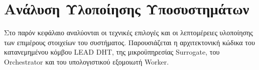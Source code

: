 
\chapter{Ανάλυση Υλοποίησης Υποσυστημάτων}
\label{ch:implementation}

Στο παρόν κεφάλαιο αναλύονται οι τεχνικές επιλογές και οι λεπτομέρειες υλοποίησης των επιμέρους στοιχείων του συστήματος. Παρουσιάζεται η αρχιτεκτονική κώδικα του κατανεμημένου κόμβου LEAD DHT, της μικροϋπηρεσίας Surrogate, του Orchestrator και του υπολογιστικού εξομοιωτή Worker.
